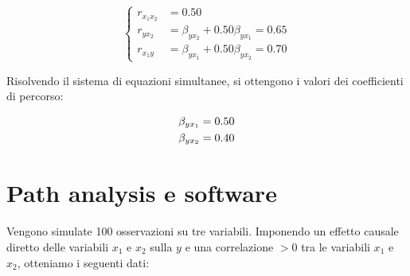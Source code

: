 \documentclass[
  11pt,
]{krantz}
\theoremstyle{definition}
\theoremstyle{definition}
\theoremstyle{definition}
\theoremstyle{definition}
\theoremstyle{remark}
\begin{document}
\begin{equation} 
\begin{cases} 
r_{x_1x_2} &= 0.50\\ 
r_{yx_2} &= \beta_{yx_2} + 0.50 \beta_{yx_1} = 0.65\\ 
r_{x_1y} &= \beta_{yx_1} +   0.50 \beta_{yx_2} = 0.70
\end{cases}
\end{equation}

Risolvendo il sistema di equazioni simultanee, si ottengono i valori dei coefficienti di percorso:

\begin{equation}
\begin{aligned}
\beta_{yx_1} &= 0.50\notag\\ 
\beta_{yx_2} &= 0.40\notag
\end{aligned}
\end{equation}

\hypertarget{path-analysis-e-software}{%
\section{Path analysis e software}\label{path-analysis-e-software}}

Vengono simulate 100 osservazioni su tre variabili. Imponendo un effetto causale diretto delle variabili \(x_1\) e \(x_2\) sulla \(y\) e una correlazione \(> 0\) tra le variabili \(x_1\) e \(x_2\), otteniamo i seguenti dati:
\end{document}
